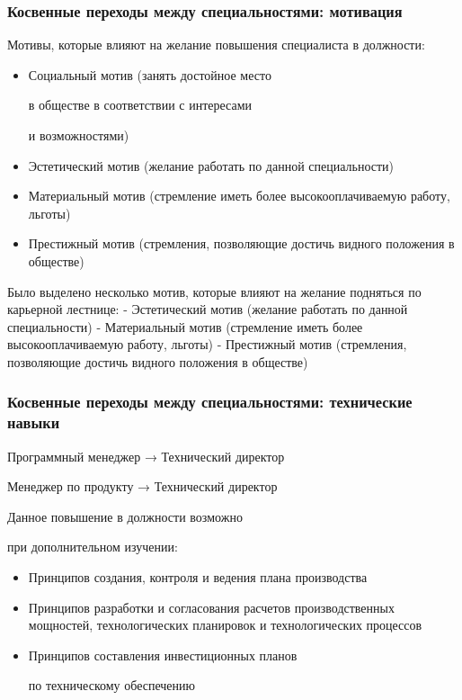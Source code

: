 \documentclass{../industrial-development}
\begin{document}
\begin{frame} \frametitle{Косвенные переходы между специальностями: мотивация }

 \begin{block}{}
Мотивы, которые влияют на желание повышения специалиста в должности:
  \end{block}
\begin{itemize}
\item Социальный мотив (занять достойное место 

в обществе в соответствии с интересами 

и возможностями)
\item Эстетический мотив (желание работать по данной специальности)
\item Материальный мотив (стремление иметь более высокооплачиваемую работу, льготы) 
\item Престижный мотив (стремления, позволяющие достичь видного положения в обществе)
  \end{itemize}
\end{frame}

\lecturenotes

Было выделено несколько мотив, которые влияют на желание подняться по карьерной лестнице:
- Эстетический мотив (желание работать по данной специальности)
- Материальный мотив (стремление иметь более высокооплачиваемую работу, льготы) 
- Престижный мотив (стремления, позволяющие достичь видного положения в обществе)



\begin{frame} \frametitle{Косвенные переходы между специальностями: технические навыки}

\begin{block}{Программный менеджер → Технический директор  

Менеджер по продукту → Технический директор }

Данное повышение в должности возможно 

при дополнительном изучении:
  \end{block}
\begin{itemize}
  \item Принципов создания, контроля и ведения плана производства
  \item Принципов разработки и согласования расчетов производственных мощностей, технологических планировок и технологических процессов
\item Принципов составления инвестиционных планов 

по техническому обеспечению
  \end{itemize}
\end{frame}
\end{document}
